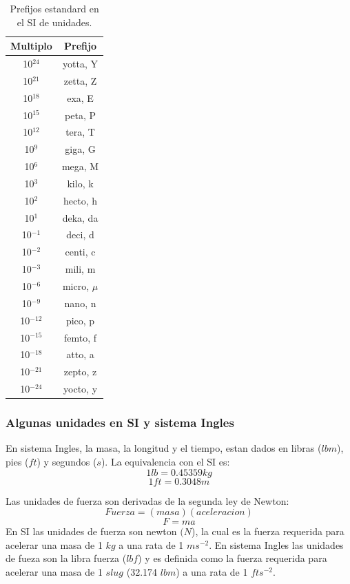\documentclass[10pt, oneside]{article}
\begin{document}
\begin{table}[h!]
\centering
\begin{tabular}{c c}
 \hline
 Multiplo & Prefijo \\ [0.5ex]
 \hline\hline
 10$^{24}$ & yotta, Y \\
 10$^{21}$ & zetta, Z \\
 10$^{18}$ & exa, E \\
 10$^{15}$ & peta, P \\
 10$^{12}$ & tera, T \\
 10$^{9}$ & giga, G \\
 10$^{6}$ & mega, M \\
 10$^{3}$ & kilo, k \\
 10$^{2}$ & hecto, h \\
 10$^{1}$ & deka, da \\
 10$^{-1}$ & deci, d \\
 10$^{-2}$ & centi, c \\
 10$^{-3}$ & mili, m \\
 10$^{-6}$ & micro, $\mu$ \\
 10$^{-9}$ & nano, n \\
 10$^{-12}$ & pico, p \\
 10$^{-15}$ & femto, f \\
 10$^{-18}$ & atto, a \\
 10$^{-21}$ & zepto, z \\
 10$^{-24}$ & yocto, y \\ [1ex]
  \hline
\end{tabular}
\caption{Prefijos estandard en el SI de unidades.}
\label{t1}
\end{table}


\subsubsection{Algunas unidades en SI y sistema Ingles}
En sistema Ingles, la masa, la longitud y el tiempo, estan dados en libras ($lbm$), pies ($ft$) y segundos ($s$). La equivalencia con el SI es:
$$
1 lb = 0.45359 kg
$$
$$
1 ft = 0.3048 m 
$$

Las unidades de fuerza son derivadas de la segunda ley de Newton:
$$
Fuerza = (masa) (aceleracion)
$$
$$
F = ma
$$
En SI las unidades de fuerza son newton $(N$), la cual es la fuerza requerida para acelerar una masa de 1 $kg$ a una rata de 1 $m s^{-2}$. En sistema Ingles las unidades de fueza son la libra fuerza ($lbf$) y es definida como la fuerza requerida para acelerar una masa de 1 $slug$ (32.174 $lbm$) a una rata de 1 $ft s^{-2}$. 
\end{document}
